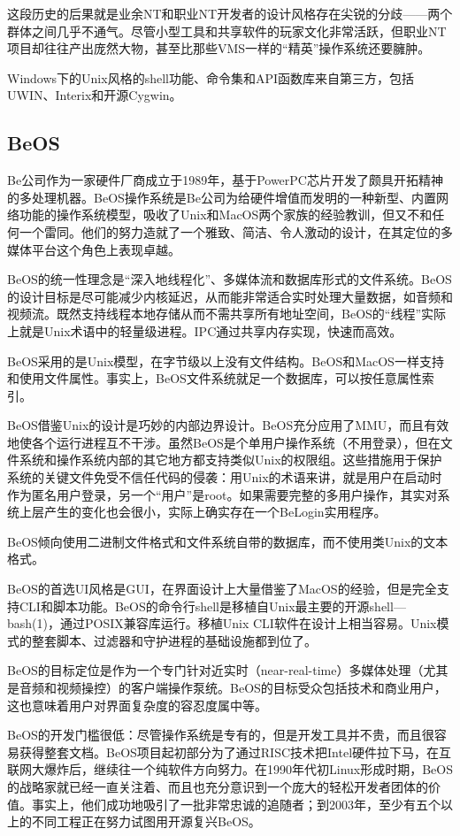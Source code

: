 \documentclass[11pt,oneside]{book}
\begin{document}
\begin{common-format}
这段历史的后果就是业余NT和职业NT开发者的设计风格存在尖锐的分歧——两个群体之间几乎不通气。尽管小型工具和共享软件的玩家文化非常活跃，但职业NT项目却往往产出庞然大物，甚至比那些VMS一样的“精英”操作系统还要臃肿。

Windows下的Unix风格的shell功能、命令集和API函数库来自第三方，包括UWIN、Interix和开源Cygwin。
 
\subsection{BeOS}
Be公司作为一家硬件厂商成立于1989年，基于PowerPC芯片开发了颇具开拓精神的多处理机器。BeOS操作系统是Be公司为给硬件增值而发明的一种新型、内置网络功能的操作系统模型，吸收了Unix和MacOS两个家族的经验教训，但又不和任何一个雷同。他们的努力造就了一个雅致、简洁、令人激动的设计，在其定位的多媒体平台这个角色上表现卓越。

BeOS的统一性理念是“深入地线程化”、多媒体流和数据库形式的文件系统。BeOS的设计目标是尽可能减少内核延迟，从而能非常适合实时处理大量数据，如音频和视频流。既然支持线程本地存储从而不需共享所有地址空间，BeOS的“线程”实际上就是Unix术语中的轻量级进程。IPC通过共享内存实现，快速而高效。

BeOS采用的是Unix模型，在字节级以上没有文件结构。BeOS和MacOS一样支持和使用文件属性。事实上，BeOS文件系统就足一个数据库，可以按任意属性索引。

BeOS借鉴Unix的设计是巧妙的内部边界设计。BeOS充分应用了MMU，而且有效地使各个运行进程互不干涉。虽然BeOS是个单用户操作系统（不用登录），但在文件系统和操作系统内部的其它地方都支持类似Unix的权限组。这些措施用于保护系统的关键文件免受不信任代码的侵袭：用Unix的术语来讲，就是用户在启动时作为匿名用户登录，另一个“用户”是root。如果需要完整的多用户操作，其实对系统上层产生的变化也会很小，实际上确实存在一个BeLogin实用程序。

BeOS倾向使用二进制文件格式和文件系统自带的数据库，而不使用类Unix的文本格式。

BeOS的首选UI风格是GUI，在界面设计上大量借鉴了MacOS的经验，但是完全支持CLI和脚本功能。BeOS的命令行shell是移植自Unix最主要的开源shell—bash(1)，通过POSIX兼容库运行。移植Unix CLI软件在设计上相当容易。Unix模式的整套脚本、过滤器和守护进程的基础设施都到位了。

BeOS的目标定位是作为一个专门针对近实时（near-real-time）多媒体处理（尤其是音频和视频操控）的客户端操作泵统。BeOS的目标受众包括技术和商业用户，这也意味着用户对界面复杂度的容忍度属中等。

BeOS的开发门槛很低：尽管操作系统是专有的，但是开发工具并不贵，而且很容易获得整套文档。BeOS项目起初部分为了通过RISC技术把Intel硬件拉下马，在互联网大爆炸后，继续往一个纯软件方向努力。在1990年代初Linux形成时期，BeOS的战略家就已经一直关注着、而且也充分意识到一个庞大的轻松开发者团体的价值。事实上，他们成功地吸引了一批非常忠诚的追随者；到2003年，至少有五个以上的不同工程正在努力试图用开源复兴BeOS。


\end{common-format}
\end{document}
